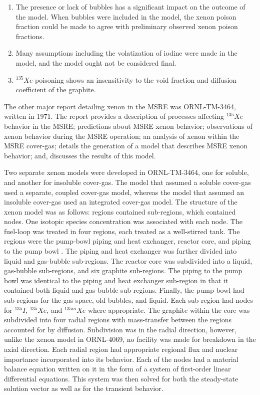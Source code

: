 \begin{enumerate}
  \item The presence or lack of bubbles has a significant impact on the outcome of the model.  When bubbles were included in the model, the xenon poison fraction could be made to agree with preliminary observed xenon poison fractions.
  \item Many assumptions including the volatization of iodine were made in the model, and the model ought not be considered final.
  \item $^{135}Xe$ poisoning shows an insensitivity to the void fraction and diffusion coefficient of the graphite. 
\end{enumerate}

The other major report detailing xenon in the MSRE was ORNL-TM-3464, written in 1971. \cite{ORNLTM3464} The report provides a description of processes affecting $^{135}Xe$ behavior in the MSRE; predictions about MSRE xenon behavior; observations of xenon behavior during the MSRE operation; an analysis of xenon within the MSRE cover-gas; details the generation of a model that describes MSRE xenon behavior; and, discusses the results of this model. 

Two separate xenon models were developed in ORNL-TM-3464, one for soluble, and another for insoluble cover-gas.  The model that assumed a soluble cover-gas used a separate, coupled cover-gas model, whereas the model that assumed an insoluble cover-gas used an integrated cover-gas model.  The structure of the xenon model was as follows: regions contained sub-regions, which contained nodes.  One isotopic species concentration was associated with each node. The fuel-loop was treated in four regions, each treated as a well-stirred tank.  The regions were the pump-bowl piping and heat exchanger,  reactor core, and piping to the pump bowl
.  The piping and heat exchanger was further divided into liquid and gas-bubble sub-regions.  The reactor core was subdivided into a liquid, gas-bubble sub-regions, and six graphite sub-regions.  The piping to the pump bowl was identical to the piping and heat exchanger sub-region in that it contained both liquid and gas-bubble sub-regions.  Finally, the pump bowl had sub-regions for the gas-space, old bubbles, and liquid.  Each sub-region had nodes for $^{135}I$, $^{135}Xe$, and $^{135m}Xe$ where appropriate. The graphite within the core was subdivided into four radial regions with mass-transfer between the regions accounted for by diffusion.  Subdivision was in the radial direction, however, unlike the xenon model in ORNL-4069, no facility was made for breakdown in the axial direction. Each radial region had appropriate regional flux and nuclear importance incorporated into its behavior.  Each of the nodes had a material balance equation written on it in the form of a system of first-order linear differential equations. This system was then solved for both the steady-state solution vector as well as for the transient behavior.

